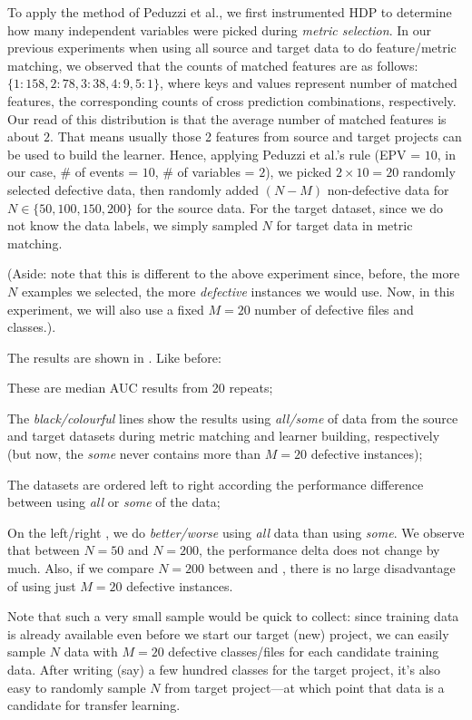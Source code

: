   To apply the method of Peduzzi et al., we first instrumented HDP to determine how many
  independent variables were picked during {\em metric  selection}. In our previous experiments when using all source and target data to do feature/metric matching, we observed that the counts of matched features are as follows: $\{1:158, 2:78, 3:38, 4:9, 5:1\}$, where keys and values represent number of matched features, the corresponding counts of cross prediction combinations, respectively. Our read of this distribution is that the average number of matched features is about $2$. That means usually those 2 features from source and target projects can be used to build the learner. Hence, applying  Peduzzi et al.'s rule (EPV = $10$,  in our case, \# of events = $10$, \# of variables = $2$), we picked $2\times 10=20$ %
  randomly selected defective data, then randomly added $(N-M)$ non-defective data for
  $N\in \{50,100,150,200\}$ for the source data. For the target dataset, since we do not
  know the data labels, we simply sampled $N$ for target data in metric matching.

  (Aside: note that this is different to the above experiment since, before, the more $N$ examples
  we selected, the more {\em defective} instances we would use. Now, in this experiment, we will also
  use a fixed $M=20$ number of defective files and classes.).

  The results are shown in . Like before:
\squishlist
  \item These are median AUC results from 20 repeats;
\item
  The {\em black/colourful} lines show the results using {\em all/some} of  data from
  the source and target datasets during metric matching and learner building, respectively
  (but now, the {\em some} never contains more than $M=20$ defective instances);
\item
  The datasets are ordered left to right according
  the performance difference between using
   {\em all} or {\em some} of the data;
   \item
     On the left/right ,  we do {\em better/worse} using
  {\em all} data than using {\em some}.
\squishend
  We observe that between $N=50$ and $N=200$, the performance delta
  does not change by much. Also, if we compare $N=200$ between 
  and , there is no large disadvantage of using just
  $M=20$ defective instances.

  Note that such a very small sample would be quick to collect: since training data is already available even before we start our target (new) project, we can easily sample $N$ data with $M=20$ defective classes/files for each candidate training data. After writing (say) a few
  hundred classes for the target project, it's also easy to randomly sample $N$ from target project---at which point that data is a candidate for transfer learning.
